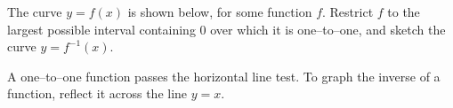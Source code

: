\begin{Mquestion}
The curve $y=f(x)$ is shown below, for some function $f$. Restrict $f$ to the largest possible interval containing $0$ over which it is one--to--one, and sketch the curve $y=f^{-1}(x)$.
\begin{center}\end{center}
\end{Mquestion}
\begin{hint}
A one--to--one function passes the horizontal line test. To graph the inverse of a function, reflect it across the line $y=x$.
\end{hint}
\begin{answer}
\begin{center}\end{center}

\end{answer}
